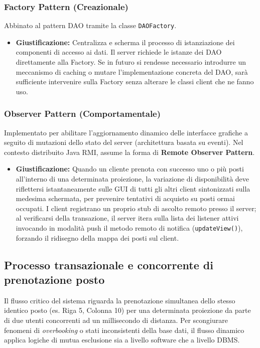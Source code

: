\documentclass[12pt, a4paper]{article}
\begin{document}
\subsubsection{Factory Pattern (Creazionale)}
Abbinato al pattern DAO tramite la classe \texttt{DAOFactory}.
\begin{itemize}
    \item \textbf{Giustificazione:} Centralizza e scherma il processo di istanziazione dei componenti di accesso ai dati. Il server richiede le istanze dei DAO direttamente alla Factory. Se in futuro si rendesse necessario introdurre un meccanismo di caching o mutare l'implementazione concreta del DAO, sarà sufficiente intervenire sulla Factory senza alterare le classi client che ne fanno uso.
\end{itemize}

\subsubsection{Observer Pattern (Comportamentale)}
Implementato per abilitare l'aggiornamento dinamico delle interfacce grafiche a seguito di mutazioni dello stato del server (architettura basata su eventi). Nel contesto distribuito Java RMI, assume la forma di \textbf{Remote Observer Pattern}.
\begin{itemize}
    \item \textbf{Giustificazione:} Quando un cliente prenota con successo uno o più posti all'interno di una determinata proiezione, la variazione di disponibilità deve riflettersi istantaneamente sulle GUI di tutti gli altri client sintonizzati sulla medesima schermata, per prevenire tentativi di acquisto su posti ormai occupati. I client registrano un proprio stub di ascolto remoto presso il server; al verificarsi della transazione, il server itera sulla lista dei listener attivi invocando in modalità push il metodo remoto di notifica (\texttt{updateView()}), forzando il ridisegno della mappa dei posti sul client.
\end{itemize}

\subsection{Processo transazionale e concorrente di prenotazione posto}
Il flusso critico del sistema riguarda la prenotazione simultanea dello stesso identico posto (es. Riga 5, Colonna 10) per una determinata proiezione da parte di due utenti concorrenti ad un millisecondo di distanza. Per scongiurare fenomeni di \textit{overbooking} o stati inconsistenti della base dati, il flusso dinamico applica logiche di mutua esclusione sia a livello software che a livello DBMS.
\end{document}
